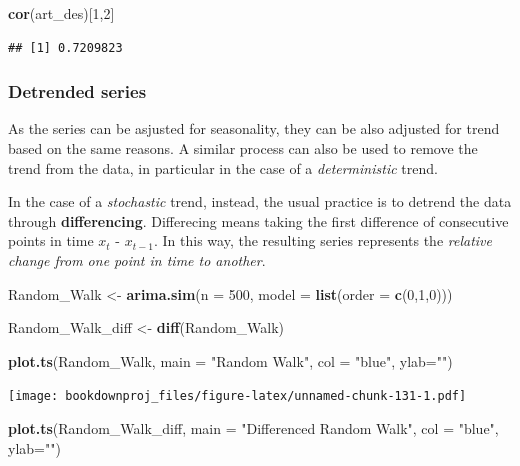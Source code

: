 \documentclass[
]{article}
\newenvironment{Shaded}{\begin{snugshade}}{\end{snugshade}}
\newcommand{\DataTypeTok}[1]{\textcolor[rgb]{0.13,0.29,0.53}{#1}}
\newcommand{\DecValTok}[1]{\textcolor[rgb]{0.00,0.00,0.81}{#1}}
\newcommand{\KeywordTok}[1]{\textcolor[rgb]{0.13,0.29,0.53}{\textbf{#1}}}
\newcommand{\NormalTok}[1]{#1}
\newcommand{\StringTok}[1]{\textcolor[rgb]{0.31,0.60,0.02}{#1}}
\begin{document}
\begin{Shaded}
\begin{Highlighting}[]
\KeywordTok{cor}\NormalTok{(art_des)[}\DecValTok{1}\NormalTok{,}\DecValTok{2}\NormalTok{]}
\end{Highlighting}
\end{Shaded}

\begin{verbatim}
## [1] 0.7209823
\end{verbatim}

\hypertarget{detrended-series}{%
\subsubsection{Detrended series}\label{detrended-series}}

As the series can be asjusted for seasonality, they can be also adjusted for trend based on the same reasons. A similar process can also be used to remove the trend from the data, in particular in the case of a \emph{deterministic} trend.

In the case of a \emph{stochastic} trend, instead, the usual practice is to detrend the data through \textbf{differencing}. Differecing means taking the first difference of consecutive points in time \(x_t\) - \(x_{t-1}\). In this way, the resulting series represents the \emph{relative change from one point in time to another}.

\begin{Shaded}
\begin{Highlighting}[]
\NormalTok{Random_Walk <-}\StringTok{ }\KeywordTok{arima.sim}\NormalTok{(}\DataTypeTok{n =} \DecValTok{500}\NormalTok{, }\DataTypeTok{model =} \KeywordTok{list}\NormalTok{(}\DataTypeTok{order =} \KeywordTok{c}\NormalTok{(}\DecValTok{0}\NormalTok{,}\DecValTok{1}\NormalTok{,}\DecValTok{0}\NormalTok{)))}

\NormalTok{Random_Walk_diff <-}\StringTok{ }\KeywordTok{diff}\NormalTok{(Random_Walk)}

\KeywordTok{plot.ts}\NormalTok{(Random_Walk,}
        \DataTypeTok{main =} \StringTok{"Random Walk"}\NormalTok{, }
        \DataTypeTok{col =} \StringTok{"blue"}\NormalTok{, }\DataTypeTok{ylab=}\StringTok{""}\NormalTok{)}
\end{Highlighting}
\end{Shaded}

\texttt{[image: bookdownproj\_files/figure-latex/unnamed-chunk-131-1.pdf]}

\begin{Shaded}
\begin{Highlighting}[]
\KeywordTok{plot.ts}\NormalTok{(Random_Walk_diff, }
        \DataTypeTok{main =} \StringTok{"Differenced Random Walk"}\NormalTok{, }
        \DataTypeTok{col =} \StringTok{"blue"}\NormalTok{, }\DataTypeTok{ylab=}\StringTok{""}\NormalTok{)}
\end{Highlighting}
\end{Shaded}
\end{document}
